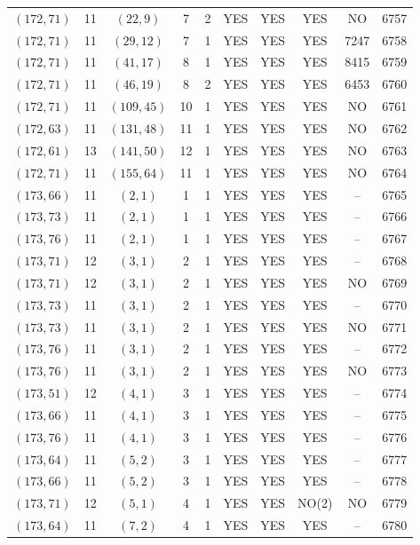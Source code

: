 \begin{longtable}{|c|c|c|c|c|c|c|c|c|c|}
$(172, 71)$ & 11 & $(22, 9)$ & 7 & 2 & YES & YES & YES & NO & 6757\\
$(172, 71)$ & 11 & $(29, 12)$ & 7 & 1 & YES & YES & YES & 7247 & 6758\\
$(172, 71)$ & 11 & $(41, 17)$ & 8 & 1 & YES & YES & YES & 8415 & 6759\\
$(172, 71)$ & 11 & $(46, 19)$ & 8 & 2 & YES & YES & YES & 6453 & 6760\\
$(172, 71)$ & 11 & $(109, 45)$ & 10 & 1 & YES & YES & YES & NO & 6761\\
$(172, 63)$ & 11 & $(131, 48)$ & 11 & 1 & YES & YES & YES & NO & 6762\\
$(172, 61)$ & 13 & $(141, 50)$ & 12 & 1 & YES & YES & YES & NO & 6763\\
$(172, 71)$ & 11 & $(155, 64)$ & 11 & 1 & YES & YES & YES & NO & 6764\\
$(173, 66)$ & 11 & $(2, 1)$ & 1 & 1 & YES & YES & YES & -- & 6765\\
$(173, 73)$ & 11 & $(2, 1)$ & 1 & 1 & YES & YES & YES & -- & 6766\\
$(173, 76)$ & 11 & $(2, 1)$ & 1 & 1 & YES & YES & YES & -- & 6767\\
$(173, 71)$ & 12 & $(3, 1)$ & 2 & 1 & YES & YES & YES & -- & 6768\\
$(173, 71)$ & 12 & $(3, 1)$ & 2 & 1 & YES & YES & YES & NO & 6769\\
$(173, 73)$ & 11 & $(3, 1)$ & 2 & 1 & YES & YES & YES & -- & 6770\\
$(173, 73)$ & 11 & $(3, 1)$ & 2 & 1 & YES & YES & YES & NO & 6771\\
$(173, 76)$ & 11 & $(3, 1)$ & 2 & 1 & YES & YES & YES & -- & 6772\\
$(173, 76)$ & 11 & $(3, 1)$ & 2 & 1 & YES & YES & YES & NO & 6773\\
$(173, 51)$ & 12 & $(4, 1)$ & 3 & 1 & YES & YES & YES & -- & 6774\\
$(173, 66)$ & 11 & $(4, 1)$ & 3 & 1 & YES & YES & YES & -- & 6775\\
$(173, 76)$ & 11 & $(4, 1)$ & 3 & 1 & YES & YES & YES & -- & 6776\\
$(173, 64)$ & 11 & $(5, 2)$ & 3 & 1 & YES & YES & YES & -- & 6777\\
$(173, 66)$ & 11 & $(5, 2)$ & 3 & 1 & YES & YES & YES & -- & 6778\\
$(173, 71)$ & 12 & $(5, 1)$ & 4 & 1 & YES & YES & NO(2) & NO & 6779\\
$(173, 64)$ & 11 & $(7, 2)$ & 4 & 1 & YES & YES & YES & -- & 6780\\

\end{longtable}
